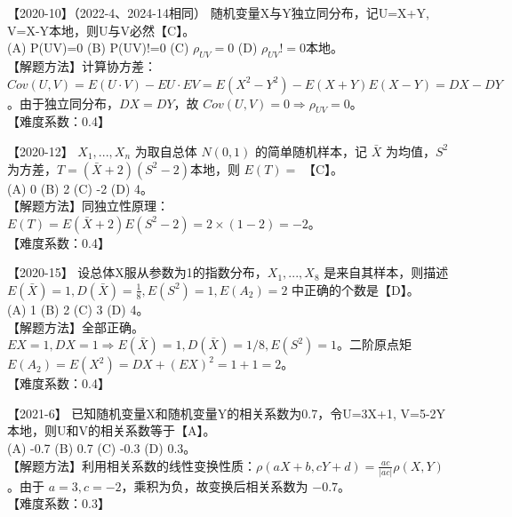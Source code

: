 \documentclass[zihao=4, a4paper, fontset=mac]{ctexart}
\begin{document}
\par\vspace{\baselineskip}

【2020-10】（2022-4、2024-14相同） 随机变量X与Y独立同分布，记U=X+Y, V=X-Y本地，则U与V必然【C】。\\
(A) P(UV)=0 \quad (B) P(UV)!=0 \quad (C) $\rho_{UV}=0$ \quad (D) $\rho_{UV}!=0本地$。\\
【解题方法】计算协方差：$Cov(U,V)=E(U\cdot V)-EU\cdot EV = E(X^2-Y^2)-E(X+Y)E(X-Y)=DX-DY$。由于独立同分布，$DX=DY$，故 $Cov(U,V)=0 \Rightarrow \rho_{UV}=0$。\\
【难度系数：0.4】

\par\vspace{\baselineskip}

【2020-12】 $X_1,...,X_n$ 为取自总体 $N(0,1)$ 的简单随机样本，记 $\bar{X}$ 为均值，$S^2$ 为方差，$T=(\bar{X}+2)(S^2-2)$本地，则 $E(T)=$ 【C】。\\
(A) 0 \quad (B) 2 \quad (C) -2 \quad (D) 4。\\
【解题方法】同独立性原理：$E(T)=E(\bar{X}+2)E(S^2-2) = 2 \times (1-2) = -2$。\\
【难度系数：0.4】

\par\vspace{\baselineskip}

【2020-15】 设总体X服从参数为1的指数分布，$X_1,...,X_8$ 是来自其样本，则描述 $E(\bar{X})=1, D(\bar{X})=\frac{1}{8}, E(S^2)=1, E(A_2)=2$ 中正确的个数是【D】。\\
(A) 1 \quad (B) 2 \quad (C) 3 \quad (D) 4。\\
【解题方法】全部正确。$EX=1, DX=1 \Rightarrow E(\bar{X})=1, D(\bar{X})=1/8, E(S^2)=1$。二阶原点矩 $E(A_2)=E(X^2)=DX+(EX)^2 = 1+1=2$。\\
【难度系数：0.4】

\par\vspace{\baselineskip}

【2021-6】 已知随机变量X和随机变量Y的相关系数为0.7，令U=3X+1, V=5-2Y本地，则U和V的相关系数等于【A】。\\
(A) -0.7 \quad (B) 0.7 \quad (C) -0.3 \quad (D) 0.3。\\
【解题方法】利用相关系数的线性变换性质：$\rho(aX+b, cY+d) = \frac{ac}{|ac|}\rho(X,Y)$。由于 $a=3, c=-2$，乘积为负，故变换后相关系数为 $-0.7$。\\
【难度系数：0.3】

\par\vspace{\baselineskip}
\end{document}
